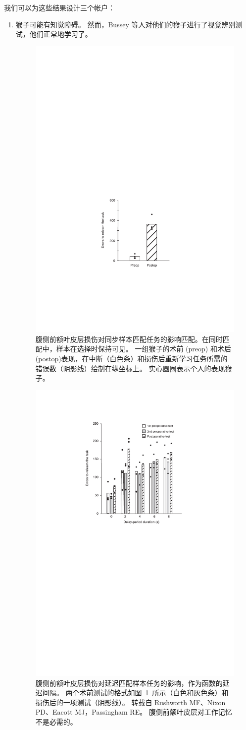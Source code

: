 我们可以为这些结果设计三个帐户：
\begin{enumerate}
\item 猴子可能有知觉障碍。 
然而，Bussey 等人\cite{bussey2001role}对他们的猴子进行了视觉辨别测试，他们正常地学习了。


\begin{figure}
	\centering
	\includegraphics[width=0.55\linewidth]{chap7/7_3}
	\caption{腹侧前额叶皮层损伤对同步样本匹配任务的影响匹配。在同时匹配中，样本在选择时保持可见。
		一组猴子的术前 (preop) 和术后 (postop)表现，在中断（白色条）和损伤后重新学习任务所需的错误数（阴影线）绘制在纵坐标上。
		实心圆圈表示个人的表现猴子\cite{rushworth1997ventral}。\label{fig:7_3}}
\end{figure}


\begin{figure}
	\centering
	\includegraphics[width=0.6\linewidth]{chap7/7_4}
	\caption{腹侧前额叶皮层损伤对延迟匹配样本任务的影响，作为函数的延迟间隔。 
		两个术前测试的格式如图~\ref{fig:7_3}~所示（白色和灰色条）和损伤后的一项测试（阴影线）。 
		转载自 Rushworth MF、Nixon PD、Eacott MJ，Passingham RE。 
		腹侧前额叶皮层对工作记忆不是必需的\cite{rushworth1997ventral}。\label{fig:7_4}}
\end{figure}



\end{enumerate}
